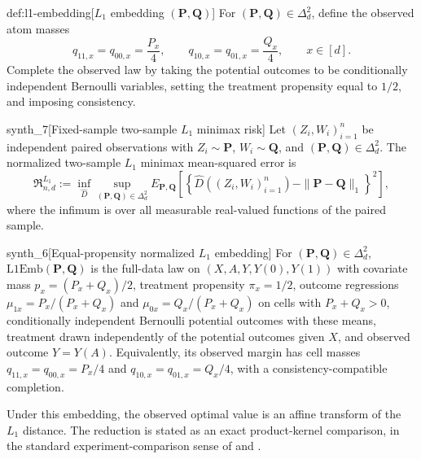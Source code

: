 \begin{definitionv}{def:l1-embedding}[\(L_1\) embedding \((\mathbf P,\mathbf Q)\)]
For \((\mathbf P,\mathbf Q)\in\Delta_d^2\), define the observed atom masses
\[
q_{11,x}=q_{00,x}=\frac{P_x}{4},
\qquad
q_{10,x}=q_{01,x}=\frac{Q_x}{4},
\qquad x\in[d].
\]
Complete the observed law by taking the potential outcomes to be conditionally independent Bernoulli variables, setting the treatment propensity equal to \(1/2\), and imposing consistency.
\end{definitionv}

\begin{definitionv}{synth_7}[Fixed-sample two-sample \(L_1\) minimax risk]
Let \((Z_i,W_i)_{i=1}^n\) be independent paired observations with \(Z_i\sim\mathbf P\), \(W_i\sim\mathbf Q\), and \((\mathbf P,\mathbf Q)\in\Delta_d^2\). The normalized two-sample \(L_1\) minimax mean-squared error is \[ \mathfrak R^{L_1}_{n,d}:=\inf_{\widehat D}\sup_{(\mathbf P,\mathbf Q)\in\Delta_d^2}E_{\mathbf P,\mathbf Q}\left[\left\{\widehat D((Z_i,W_i)_{i=1}^n)-\|\mathbf P-\mathbf Q\|_1\right\}^2\right], \] where the infimum is over all measurable real-valued functions of the paired sample.
\end{definitionv}

\begin{definitionv}{synth_6}[Equal-propensity normalized \(L_1\) embedding]
For \((\mathbf P,\mathbf Q)\in\Delta_d^2\), \(\mathrm{L1Emb}(\mathbf P,\mathbf Q)\) is the full-data law on \((X,A,Y,Y(0),Y(1))\) with covariate mass \(p_x=(P_x+Q_x)/2\), treatment propensity \(\pi_x=1/2\), outcome regressions \(\mu_{1x}=P_x/(P_x+Q_x)\) and \(\mu_{0x}=Q_x/(P_x+Q_x)\) on cells with \(P_x+Q_x>0\), conditionally independent Bernoulli potential outcomes with these means, treatment drawn independently of the potential outcomes given \(X\), and observed outcome \(Y=Y(A)\). Equivalently, its observed margin has cell masses \(q_{11,x}=q_{00,x}=P_x/4\) and \(q_{10,x}=q_{01,x}=Q_x/4\), with a consistency-compatible completion.
\end{definitionv}

Under this embedding, the observed optimal value is an affine transform of the \(L_1\) distance. The reduction is stated as an exact product-kernel comparison, in the standard experiment-comparison sense of \citet{LeCam1986} and \citet{Tsybakov2009}.

